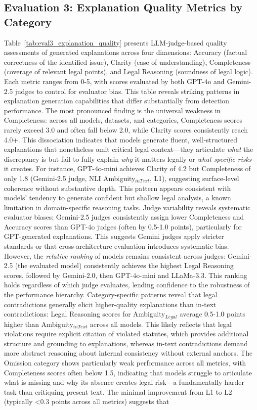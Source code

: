 \documentclass[11pt]{article}
\begin{document}
\subsection{Evaluation 3: Explanation Quality Metrics by Category}
\label{sec:appendix-eval3-explanation}

Table~\ref{tab:eval3_explanation_quality} presents LLM-judge-based quality assessments of generated explanations across four dimensions: Accuracy (factual correctness of the identified issue), Clarity (ease of understanding), Completeness (coverage of relevant legal points), and Legal Reasoning (soundness of legal logic). Each metric ranges from 0-5, with scores evaluated by both GPT-4o and Gemini-2.5 judges to control for evaluator bias. This table reveals striking patterns in explanation generation capabilities that differ substantially from detection performance. The most pronounced finding is the universal weakness in Completeness: across all models, datasets, and categories, Completeness scores rarely exceed 3.0 and often fall below 2.0, while Clarity scores consistently reach 4.0+. This dissociation indicates that models generate fluent, well-structured explanations that nonetheless omit critical legal context—they articulate \textit{what} the discrepancy is but fail to fully explain \textit{why} it matters legally or \textit{what specific risks} it creates. For instance, GPT-4o-mini achieves Clarity of 4.2 but Completeness of only 1.8 (Gemini-2.5 judge, NLI Ambiguity$_{inText}$, L1), suggesting surface-level coherence without substantive depth. This pattern appears consistent with models' tendency to generate confident but shallow legal analysis, a known limitation in domain-specific reasoning tasks. Judge variability reveals systematic evaluator biases: Gemini-2.5 judges consistently assign lower Completeness and Accuracy scores than GPT-4o judges (often by 0.5-1.0 points), particularly for GPT-generated explanations. This suggests Gemini judges apply stricter standards or that cross-architecture evaluation introduces systematic bias. However, the \textit{relative ranking} of models remains consistent across judges: Gemini-2.5 (the evaluated model) consistently achieves the highest Legal Reasoning scores, followed by Gemini-2.0, then GPT-4o-mini and LLaMa-3.3. This ranking holds regardless of which judge evaluates, lending confidence to the robustness of the performance hierarchy. Category-specific patterns reveal that legal contradictions generally elicit higher-quality explanations than in-text contradictions: Legal Reasoning scores for Ambiguity$_{Legal}$ average 0.5-1.0 points higher than Ambiguity$_{inText}$ across all models. This likely reflects that legal violations require explicit citation of violated statutes, which provides additional structure and grounding to explanations, whereas in-text contradictions demand more abstract reasoning about internal consistency without external anchors. The Omission category shows particularly weak performance across all metrics, with Completeness scores often below 1.5, indicating that models struggle to articulate what is missing and why its absence creates legal risk—a fundamentally harder task than critiquing present text. The minimal improvement from L1 to L2 (typically <0.3 points across all metrics) suggests that 
\end{document}
